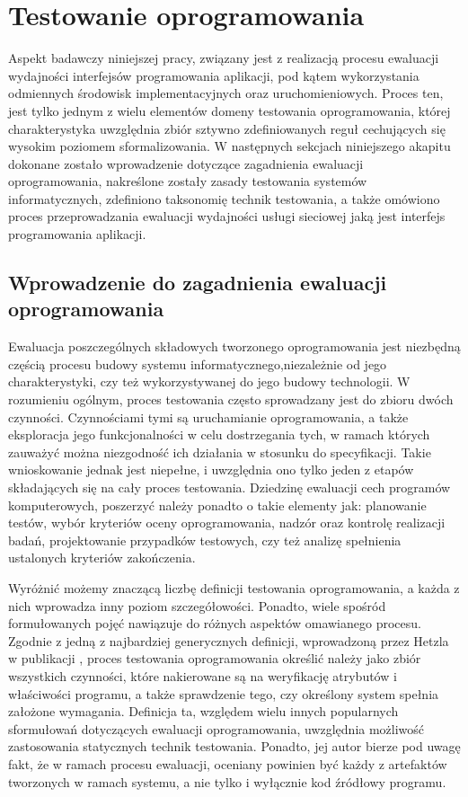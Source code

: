 \section{Testowanie oprogramowania}
Aspekt badawczy niniejszej pracy, związany jest z realizacją procesu ewaluacji wydajności interfejsów programowania aplikacji, pod kątem wykorzystania odmiennych środowisk implementacyjnych oraz uruchomieniowych. Proces ten, jest tylko jednym z wielu elementów domeny testowania oprogramowania, której charakterystyka uwzględnia zbiór sztywno zdefiniowanych reguł cechujących się wysokim poziomem sformalizowania. W następnych sekcjach niniejszego akapitu dokonane zostało wprowadzenie dotyczące zagadnienia ewaluacji oprogramowania, nakreślone zostały zasady testowania systemów informatycznych, zdefiniono taksonomię technik testowania, a także omówiono proces przeprowadzania ewaluacji wydajności usługi sieciowej jaką jest interfejs programowania aplikacji. 
\subsection*{Wprowadzenie do zagadnienia ewaluacji oprogramowania}
Ewaluacja poszczególnych składowych tworzonego oprogramowania jest niezbędną częścią procesu budowy systemu informatycznego,niezależnie od jego charakterystyki, czy też wykorzystywanej do jego budowy technologii. W rozumieniu ogólnym, proces testowania często sprowadzany jest do zbioru dwóch czynności. Czynnościami tymi są uruchamianie oprogramowania, a także eksploracja jego funkcjonalności w celu dostrzegania tych, w ramach których zauważyć można niezgodność ich działania w stosunku do specyfikacji. Takie wnioskowanie jednak jest niepełne, i uwzględnia ono tylko jeden z etapów składających się na cały proces testowania. Dziedzinę ewaluacji cech programów komputerowych, poszerzyć należy ponadto o takie elementy jak: planowanie testów, wybór kryteriów oceny oprogramowania, nadzór oraz kontrolę realizacji badań, projektowanie przypadków testowych, czy też analizę spełnienia ustalonych kryteriów zakończenia.

Wyróżnić możemy znaczącą liczbę definicji testowania oprogramowania, a każda z nich wprowadza inny poziom szczegółowości. Ponadto, wiele spośród formułowanych pojęć nawiązuje do różnych aspektów omawianego procesu. Zgodnie z jedną z najbardziej generycznych definicji, wprowadzoną przez Hetzla w publikacji \cite{hetzel}, proces testowania oprogramowania określić należy jako zbiór wszystkich czynności, które nakierowane są na weryfikację atrybutów i właściwości programu, a także sprawdzenie tego, czy określony system spełnia założone wymagania. Definicja ta, względem wielu innych popularnych sformułowań dotyczących ewaluacji oprogramowania, uwzględnia możliwość zastosowania statycznych technik testowania. Ponadto, jej autor bierze pod uwagę fakt, że w ramach procesu ewaluacji, oceniany powinien być każdy z artefaktów tworzonych w ramach systemu, a nie tylko i wyłącznie kod źródłowy programu.
